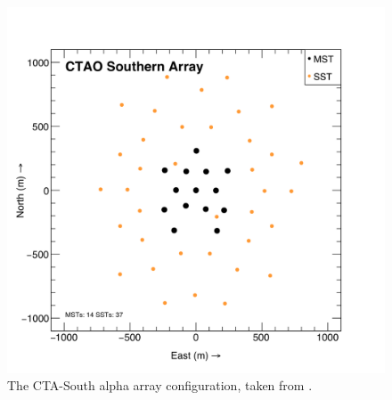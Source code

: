 \begin{figure}[ht] 
        \centering \includegraphics[width=0.7\columnwidth]{figures/southlayout.png}
        \caption{
                \label{fig:southlayout} %
                The CTA-South alpha array configuration, taken from \cite{zencta}.
        }
\end{figure}
